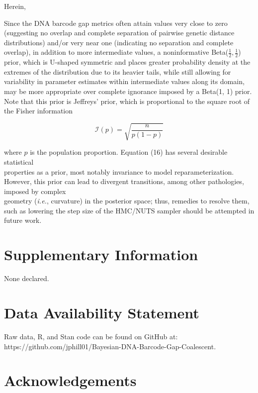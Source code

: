 \documentclass[12pt]{article}
\begin{document}
Herein, 

Since the DNA barcode gap metrics often attain values very close to zero (suggesting no overlap and complete separation of pairwise genetic distance distributions) and/or very near one (indicating no separation and complete overlap), in addition to more intermediate values, a noninformative Beta($\frac{1}{2}, \frac{1}{2}$) prior, which is U-shaped symmetric and places greater probability density at the extremes of the distribution due to its heavier tails, while still allowing for variability in parameter estimates within intermediate values along its domain, may be more appropriate over complete ignorance imposed by a Beta(1, 1) prior. Note that this prior is Jeffreys' prior, which is proportional to the square root of the Fisher information 

\begin{equation}
\mathcal{I}(p) = \sqrt{\frac{n}{p(1-p)}}
\end{equation}

\noindent where $p$ is the population proportion. Equation (16) has several desirable statistical \\ properties as a prior, most notably invariance to model reparameterization. However, this prior can lead to divergent transitions, among other pathologies, imposed by complex \\ geometry (\textit{i.e.}, curvature) in the posterior space; thus, remedies to resolve them, such as lowering the step size of the HMC/NUTS sampler should be attempted in future work. 


\newpage

\section*{Supplementary Information}

None declared.

\section*{Data Availability Statement}

Raw data, R, and Stan code can be found on GitHub at: \\ https://github.com/jphill01/Bayesian-DNA-Barcode-Gap-Coalescent.

\section*{Acknowledgements}
\end{document}

